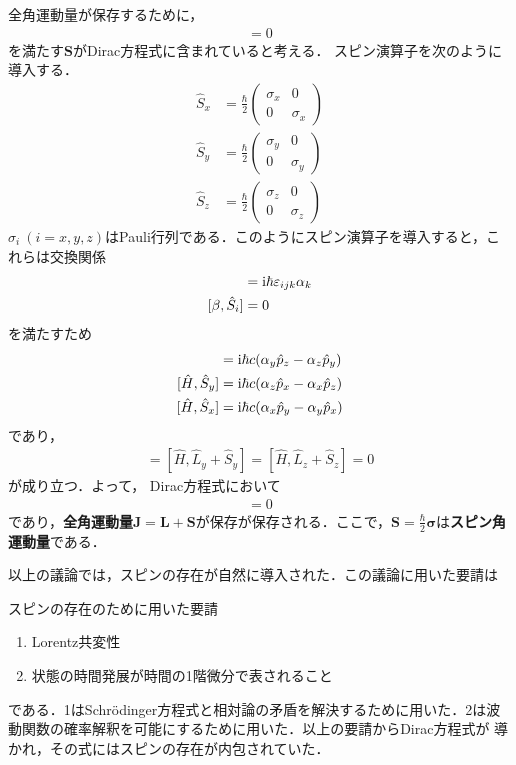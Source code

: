 \documentclass{report}
\begin{document}
  全角運動量が保存するために，
  \begin{align}
    [\hat{H}, \hat{\bm{L}} + \hat{\bm{S}}] = 0
  \end{align}
  を満たす$\bm{S}$がDirac方程式に含まれていると考える．
  スピン演算子を次のように導入する．
  \begin{align}
    \hat{S}_x &= \frac{\hbar}{2}
    \begin{pmatrix}
      \sigma_x & 0\\
      0& \sigma_x
    \end{pmatrix}\\
    \hat{S}_y &= \frac{\hbar}{2}
    \begin{pmatrix}
      \sigma_y & 0\\
      0& \sigma_y
    \end{pmatrix}\\
    \hat{S}_z &= \frac{\hbar}{2}
    \begin{pmatrix}
      \sigma_z & 0\\
      0& \sigma_z
    \end{pmatrix}
  \end{align}
  $\sigma_i\ (i=x,y,z)$はPauli行列である．このようにスピン演算子を導入すると，これらは交換関係
  \begin{align}
    [\alpha_i, \hat{S}_j] &= \i \hbar \epsilon_{ijk} \alpha_k\\
    [\beta, \hat{S}_i] &= 0
  \end{align}
  を満たすため
  \begin{align}
    [\hat{H}, \hat{S}_x] &= \i\hbar c(\alpha_y \hat{p}_z - \alpha_z \hat{p}_y)\\
    [\hat{H}, \hat{S}_y] &= \i\hbar c(\alpha_z \hat{p}_x - \alpha_x \hat{p}_z)\\
    [\hat{H}, \hat{S}_x] &= \i\hbar c(\alpha_x \hat{p}_y - \alpha_y \hat{p}_x)
  \end{align}
  であり，
  \begin{align}
    [\hat{H}, \hat{L}_x + \hat{S}_x] = [\hat{H}, \hat{L}_y + \hat{S}_y] = [\hat{H}, \hat{L}_z + \hat{S}_z] = 0
  \end{align}
  が成り立つ．よって，
  Dirac方程式において
  \begin{align}
    [\hat{H}, \hat{\bm{L}} + \hat{\bm{S}}] = 0
  \end{align}
  であり，\textbf{全角運動量}$\bm{J} = \bm{L} + \bm{S}$が保存が保存される．ここで，$\bm{S} = \frac{\hbar}{2}\bm{\sigma}$は\textbf{スピン角運動量}である．

  以上の議論では，スピンの存在が自然に導入された．この議論に用いた要請は
  \begin{itembox}[l]{スピンの存在のために用いた要請}
  \begin{enumerate}
    \item Lorentz共変性
    \item 状態の時間発展が時間の1階微分で表されること
  \end{enumerate}
  \end{itembox}
  である．1はSchrödinger方程式と相対論の矛盾を解決するために用いた．2は波動関数の確率解釈を可能にするために用いた．以上の要請からDirac方程式が
  導かれ，その式にはスピンの存在が内包されていた．
\end{document}
